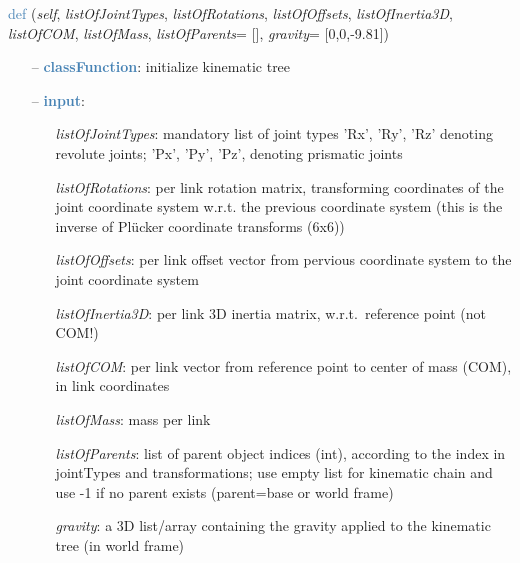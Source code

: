\begin{itemize}[leftmargin=1.4cm]
\begin{itemize}[leftmargin=1.4cm]
\begin{itemize}[leftmargin=0.5cm]
\begin{itemize}[leftmargin=1.4cm]
\begin{itemize}[leftmargin=1.4cm]
\begin{itemize}[leftmargin=0.5cm]
\begin{itemize}[leftmargin=1.4cm]
\begin{itemize}[leftmargin=0.5cm]
\begin{itemize}[leftmargin=1.4cm]
\begin{itemize}[leftmargin=1.4cm]
\begin{itemize}[leftmargin=1.4cm]
\begin{itemize}[leftmargin=0.7cm]
\vspace{24pt}\end{itemize}
%
\begin{flushleft}
\noindent \textcolor{steelblue}{def {\bf {}}}\label{sec:kinematicTree:KinematicTree33:__init__}
({\it self}, {\it listOfJointTypes}, {\it listOfRotations}, {\it listOfOffsets}, {\it listOfInertia3D}, {\it listOfCOM}, {\it listOfMass}, {\it listOfParents}= [], {\it gravity}= [0,0,-9.81])
\end{flushleft}
\setlength{\itemindent}{0.7cm}
\begin{itemize}[leftmargin=0.7cm]
\item[--]\textcolor{steelblue}{\bf classFunction}: initialize kinematic tree
\item[--]\textcolor{steelblue}{\bf input}: \vspace{-6pt}
\begin{itemize}[leftmargin=1.2cm]
\setlength{\itemindent}{-0.7cm}
\item[]{\it listOfJointTypes}: mandatory list of joint types 'Rx', 'Ry', 'Rz' denoting revolute joints; 'Px', 'Py', 'Pz', denoting prismatic joints
\item[]{\it listOfRotations}: per link rotation matrix, transforming coordinates of the joint coordinate system w.r.t. the previous coordinate system (this is the inverse of Pl\"ucker coordinate transforms (6x6))
\item[]{\it listOfOffsets}: per link offset vector from pervious coordinate system to the joint coordinate system
\item[]{\it listOfInertia3D}: per link 3D inertia matrix, w.r.t.\ reference point (not COM!)
\item[]{\it listOfCOM}: per link vector from reference point to center of mass (COM), in link coordinates
\item[]{\it listOfMass}: mass per link
\item[]{\it listOfParents}: list of parent object indices (int), according to the index in jointTypes and transformations; use empty list for kinematic chain and use -1 if no parent exists (parent=base or world frame)
\item[]{\it gravity}: a 3D list/array containing the gravity applied to the kinematic tree (in world frame)
\end{itemize}
\vspace{12pt}\end{itemize}

\end{itemize}
\end{itemize}
\end{itemize}
\end{itemize}
\end{itemize}
\end{itemize}
\end{itemize}
\end{itemize}
\end{itemize}
\end{itemize}
\end{itemize}
